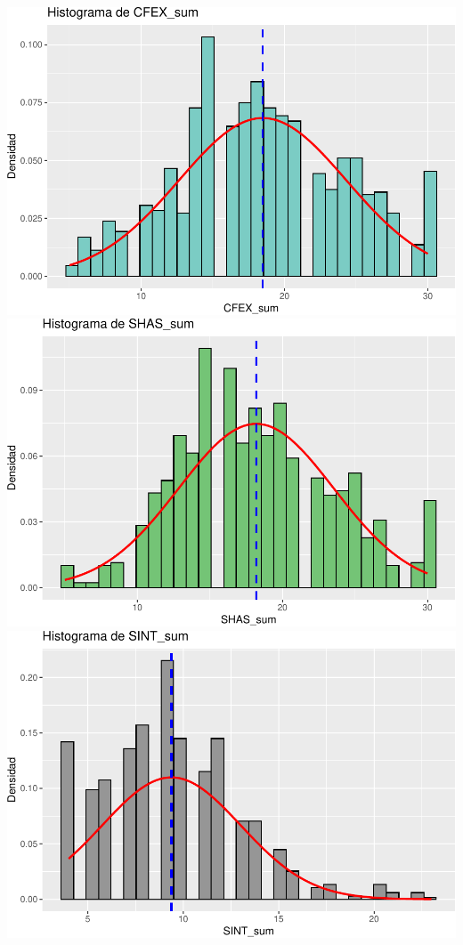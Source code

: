 \documentclass[
]{article}
\begin{document}
\includegraphics{Info_Dinix_02_files/figure-latex/30_Histos-4.pdf}
\includegraphics{Info_Dinix_02_files/figure-latex/30_Histos-5.pdf}
\includegraphics{Info_Dinix_02_files/figure-latex/30_Histos-6.pdf}
\end{document}
